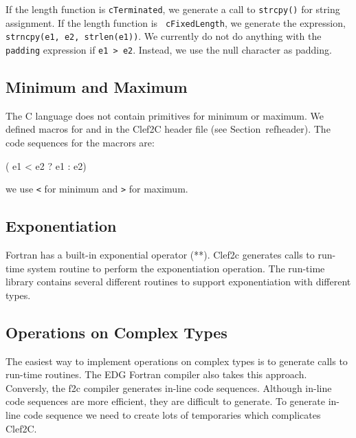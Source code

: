 If the length function is {\tt cTerminated}, we generate a call to
{\tt strcpy()} for string assignment.  If the length function is {\tt
cFixedLength}, we generate the expression, {\tt strncpy(e1, e2,
strlen(e1))}.  We currently do not do anything with the {\tt padding}
expression if {\tt e1 > e2}.  Instead, we use the null character as
padding.

\subsection{Minimum and Maximum}

The C language does not contain primitives for minimum or maximum.
We defined macros for  and  in the Clef2C
header file (see Section~ref{header}).  The code sequences
for the macrors are:
\begin{codeseq}
\>( e1 < e2 ? e1 : e2)
\end{codeseq}
we use {\tt <} for minimum and {\tt >} for maximum.

\subsection{Exponentiation}

Fortran has a built-in exponential operator (**).  Clef2c generates
calls to run-time system routine to perform the exponentiation
operation.  The run-time library contains several different routines
to support exponentiation with different types.

\subsection{Operations on Complex Types}\label{complexops}

The easiest way to implement operations on complex types is to
generate calls to run-time routines.  The EDG Fortran compiler also
takes this approach.  Conversly, the f2c compiler generates in-line
code sequences.  Although in-line code sequences are more efficient,
they are difficult to generate.  To generate in-line code sequence we
need to create lots of temporaries which complicates Clef2C.

